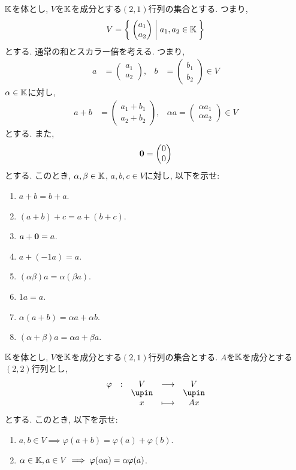 \begin{quiz}
  $\mathbb{K}$を体とし, $V$を$\mathbb{K}$を成分とする$(2,1)$行列の集合とする.
  つまり,
  \begin{align*}
    V=\Set{\begin{pmatrix}a_1\\a_2\end{pmatrix}|a_1,a_2\in \mathbb{K}}
  \end{align*}
  とする. 通常の和とスカラー倍を考える.  つまり,
  \begin{align*}
    a&=\begin{pmatrix}a_1\\a_2\end{pmatrix}, & b&=\begin{pmatrix}b_1\\b_2\end{pmatrix} \in V
  \end{align*}
  $\alpha\in\mathbb{K}$に対し,
  \begin{align*}
    a+b&=\begin{pmatrix}a_1+b_1\\a_2+b_2\end{pmatrix}, & \alpha a=\begin{pmatrix}\alpha a_1\\\alpha a_2\end{pmatrix} \in V
  \end{align*}
  とする. また,
  \begin{align*}
  \boldsymbol{0}=
  \begin{pmatrix}
    0\\0
  \end{pmatrix}
  \end{align*}
  とする.
  このとき, $\alpha,\beta\in\mathbb{K}$, $a,b,c\in V$に対し, 以下を示せ:
  \begin{enumerate}
    \item $a+b=b+a$.
    \item $(a+b)+c=a+(b+c)$.
    \item $a+\boldsymbol{0}=a$.
    \item $a+(-1 a)=a$.
    \item $(\alpha\beta)a=\alpha(\beta a)$.
    \item $1a=a$.
    \item $\alpha(a+b)=\alpha a+\alpha b$.
    \item $(\alpha+\beta)a=\alpha a+\beta a$.
  \end{enumerate}
\end{quiz}

\begin{quiz}
  $\mathbb{K}$を体とし, $V$を$\mathbb{K}$を成分とする$(2,1)$行列の集合とする.
  $A$を$\mathbb{K}$を成分とする$(2,2)$行列とし,
  \begin{align*}
    \shazo{\varphi}{V}{V}{x}{Ax}
  \end{align*}
  とする.
  このとき, 以下を示せ:
  \begin{enumerate}
    \item $a,b\in V\implies \varphi(a+b)=\varphi(a)+\varphi(b)$.
    \item $\alpha\in\mathbb{K}, a\in V\implies \varphi(\alpha a)=\alpha\varphi(a)$.
  \end{enumerate}
\end{quiz}

